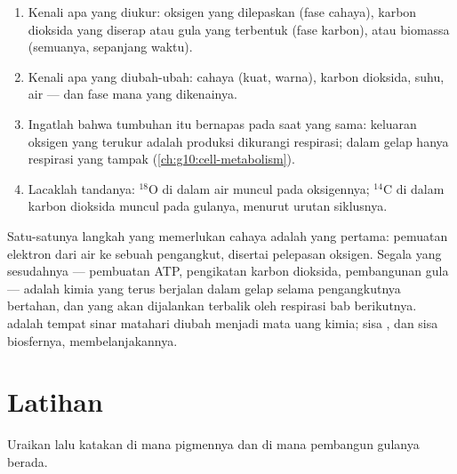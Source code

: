 \begin{method}\label{met:g12:photosynthesis:experiment}
\begin{enumerate}
  \item Kenali apa yang diukur: oksigen yang dilepaskan (fase cahaya),
        karbon dioksida yang diserap atau gula yang terbentuk (fase
        karbon), atau biomassa (semuanya, sepanjang waktu).
  \item Kenali apa yang diubah-ubah: cahaya (kuat, warna), karbon
        dioksida, suhu, air --- dan fase mana yang dikenainya.
  \item Ingatlah bahwa tumbuhan itu bernapas pada saat yang sama:
        keluaran oksigen yang terukur adalah produksi dikurangi
        respirasi; dalam gelap hanya respirasi yang tampak
        (\cref{ch:g10:cell-metabolism}).
  \item Lacaklah tandanya: $^{18}$O di dalam air muncul pada
        oksigennya; $^{14}$C di dalam karbon dioksida muncul pada
        gulanya, menurut urutan siklusnya.
\end{enumerate}
\end{method}

\begin{remark}\label{rem:g12:photosynthesis:light}
Satu-satunya langkah  yang memerlukan cahaya adalah yang
pertama: pemuatan elektron dari air ke sebuah pengangkut, disertai
pelepasan oksigen. Segala yang sesudahnya --- pembuatan ATP,
pengikatan karbon dioksida, pembangunan gula --- adalah kimia yang
terus berjalan dalam gelap selama pengangkutnya bertahan, dan yang
akan dijalankan terbalik oleh respirasi bab berikutnya. 
adalah tempat sinar matahari diubah menjadi mata uang kimia; sisa
, dan sisa biosfernya, membelanjakannya.
\end{remark}

\section{Latihan}

\begin{exercise}[$\star$]\label{exo:g12:photosynthesis:1}
Uraikan  lalu katakan di mana pigmennya dan di mana 
pembangun gulanya berada.
\end{exercise}

